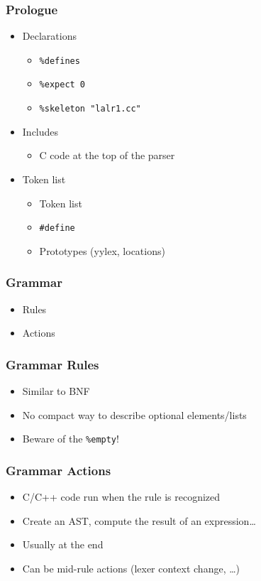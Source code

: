 \documentclass{beamer}
\begin{document}
\begin{frame}
  \frametitle{Prologue}
    \begin{itemize}
      \item Declarations
      \begin{itemize}
        \item \texttt{\%defines}
        \item \texttt{\%expect 0}
        \item \texttt{\%skeleton "lalr1.cc"}
      \end{itemize}
      \item Includes
      \begin{itemize}
        \item C code at the top of the parser
      \end{itemize}
      \item Token list
      \begin{itemize}
        \item Token list
        \item \texttt{\#define}
        \item Prototypes (yylex, locations)
      \end{itemize}
  \end{itemize}
\end{frame}

\begin{frame}
  \frametitle{Grammar}
    \begin{itemize}
      \item Rules
      \item Actions
    \end{itemize}
\end{frame}

\begin{frame}
  \frametitle{Grammar Rules}
    \begin{itemize}
      \item Similar to BNF
      \item No compact way to describe optional elements/lists
      \item Beware of the \texttt{\%empty}!
    \end{itemize}
\end{frame}

\begin{frame}
  \frametitle{Grammar Actions}
    \begin{itemize}
      \item C/C++ code run when the rule is recognized
      \item Create an AST, compute the result of an expression\ldots
      \item Usually at the end
      \item Can be mid-rule actions (lexer context change, \ldots)
    \end{itemize}
\end{frame}
\end{document}
